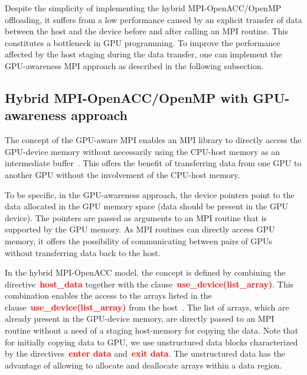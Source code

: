 


\par
Despite the simplicity of implementing the hybrid MPI-OpenACC/OpenMP offloading, it suffers from a low performance caused by an explicit transfer of data between the host and the device before and after calling an MPI routine.
This constitutes a bottleneck in GPU programming.
To improve the performance affected by the host staging during the data transfer, one can implement the GPU-awareness MPI approach as described in the following subsection.




\subsection{Hybrid MPI-OpenACC/OpenMP with GPU-awareness approach}


\par
The concept of the GPU-aware MPI enables an MPI library to directly access the GPU-device memory without necessarily using the CPU-host memory as an intermediate buffer~\cite{gpu_aware_mpi}.
This offers the benefit of transferring data from one GPU to another GPU without the involvement of the CPU-host memory.


\par
To be specific, in the GPU-awareness approach, the device pointers point to the data allocated in the GPU memory space (data should be present in the GPU device).
The pointers are passed as arguments to an MPI routine that is supported by the GPU memory.
As MPI routines can directly access GPU memory, it offers the possibility of communicating between pairs of GPUs without transferring data back to the host.


\par
In the hybrid MPI-OpenACC model, the concept is defined by combining the directive~\textbf{\textcolor{red}{host\_data}} together with the clause~\textbf{\textcolor{red}{use\_device(list\_array)}}.
This combination enables the access to the arrays listed in the clause~\textbf{\textcolor{red}{use\_device(list\_array)}} from the host~\cite{openacc_u_device}.
The list of arrays, which are already present in the GPU-device memory, are directly passed to an MPI routine without a need of a staging host-memory for copying the data.
Note that for initially copying data to GPU, we use unstructured data blocks characterized by the directives~\textbf{\textcolor{red}{enter data}} and~\textbf{\textcolor{red}{exit data}}.
The unstructured data has the advantage of allowing to allocate and deallocate arrays within a data region.


